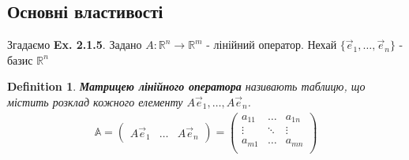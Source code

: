 \documentclass[a4paper, 10pt]{article}
\theoremstyle{theoremdd}
\theoremstyle{theoremdd}
\newtheorem{definition}[theorem]{Definition}
\theoremstyle{theoremdd}
\theoremstyle{theoremdd}
\theoremstyle{theoremdd}
\theoremstyle{theoremdd}
\theoremstyle{theoremdd}
\theoremstyle{theoremdd}
\begin{document}
	\subsection{Основні властивості}
	Згадаємо \textbf{Ex. 2.1.5}. Задано $A: \mathbb{R}^n \to \mathbb{R}^m$ - лінійний оператор. Нехай $\{ \vec{e}_1, \dots, \vec{e}_n \}$ - базис $\mathbb{R}^n$
	\begin{definition}
	\textbf{Матрицею лінійного оператора} називають таблицю, що містить розклад кожного елементу $A \vec{e}_1, \dots, A \vec{e}_n$.
	\begin{align*}
	\mathbb{A} = \begin{pmatrix}
	A\vec{e}_1 & \dots & A\vec{e}_n
\end{pmatrix} = \begin{pmatrix}
	a_{11} & \dots & a_{1n} \\
	\vdots & \ddots & \vdots \\
	a_{m1} & \dots & a_{mn} \\
	\end{pmatrix}
	\end{align*}
	\end{definition}
	
\end{document}
